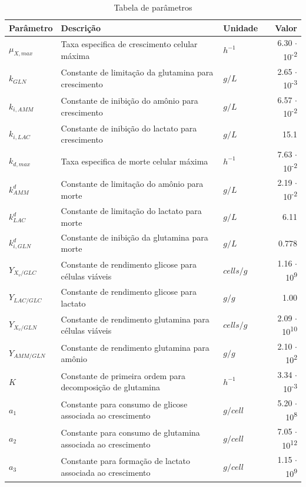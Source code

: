 \documentclass[fleqn,10pt]{SelfArx} %
\begin{document}
\begin{table}[hb]
	\caption{Tabela de parâmetros}
	\centering
	\begin{tabular}{lllr}
		\toprule
		Parâmetro & Descrição & Unidade & Valor\\
		\midrule
		$\mu _{X,max}$ & Taxa especifica de crescimento celular máxima & $h^{-1}$ & 6.30 $\cdot$ 10\textsuperscript{-2}\\
		$k_{GLN}$ & Constante de limitação da glutamina para crescimento & $g/L$ & 2.65 $\cdot$ 10\textsuperscript{-3}\\
		$k_{i,AMM}$ & Constante de inibição do amônio para crescimento & $g/L$ & 6.57 $\cdot$ 10\textsuperscript{-2}\\
		$k_{i,LAC}$ & Constante de inibição do lactato para crescimento & $ g/L $ & 15.1\\
		$k_{d,max}$ & Taxa especifica de morte celular máxima & $h^{-1}$ & 7.63 $\cdot$ 10\textsuperscript{-2}\\
		$k_{AMM}^d$ & Constante de limitação do amônio para morte& $ g/L $ & 2.19 $\cdot$ 10\textsuperscript{-2}\\
		$k_{LAC}^d$ & Constante de limitação do lactato para morte& $ g/L $ & 6.11\\
		$k_{i,GLN}^d$ & Constante de inibição da glutamina para morte& $ g/L $ & 0.778\\
		$Y_{X_v/GLC}$ & Constante de rendimento glicose para células viáveis & $cells/g$ &  1.16 $\cdot$ 10\textsuperscript{9}\\
		$Y_{LAC/GLC}$ & Constante de rendimento glicose para lactato & $ g/g $ & 1.00\\
		$Y_{X_v/GLN}$ & Constante de rendimento glutamina para células viáveis& $ cells/g $ & 2.09 $\cdot$ 10\textsuperscript{10}\\
		$Y_{AMM/GLN}$ & Constante de rendimento glutamina para amônio & $g/g$ & 2.10 $\cdot$ 10\textsuperscript{2}\\
		$K$ & Constante de primeira ordem para decomposição de glutamina & $h^{-1}$ &3.34 $\cdot$ 10\textsuperscript{-3}\\
		$a_1$ & Constante para consumo de glicose associada ao crescimento& $ g/cell $ &5.20 $\cdot$ 10\textsuperscript{8}\\
		$a_2$ & Constante para consumo de glutamina associada ao crescimento& $ g/cell $ & 7.05 $\cdot$ 10\textsuperscript{12}\\
		$a_3$ & Constante para formação de lactato associada ao crescimento& $ g/cell $ &  1.15 $\cdot$ 10\textsuperscript{9}\\

\end{tabular}
\end{table}
\end{document}
